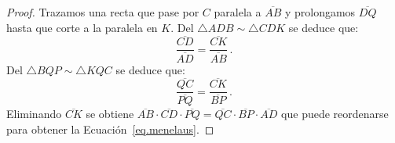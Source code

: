 \begin{proof}
Trazamos una recta que pase por $C$ paralela a $\overline{AB}$ y prolongamos $\overline{DQ}$ hasta que corte a la paralela en $K$. Del $\triangle ADB \sim \triangle CDK$ se deduce que:
\begin{equation*}
\displaystyle\frac{\overline{CD}}{\overline{AD}}=\displaystyle\frac{\overline{CK}}{\overline{AB}}\,.
\end{equation*}
Del $\triangle BQP\sim \triangle KQC$ se deduce que:
\begin{equation*}
\displaystyle\frac{\overline{QC}}{\overline{PQ}}=\displaystyle\frac{\overline{CK}}{\overline{BP}}\,.
\end{equation*}
Eliminando $\overline{CK}$ se obtiene
$\overline{AB}\cdot\overline{CD}\cdot\overline{PQ}=\overline{QC}\cdot\overline{BP}\cdot\overline{AD}$ que puede reordenarse para obtener la Ecuación~\ref{eq.menelaus}.
\end{proof}


